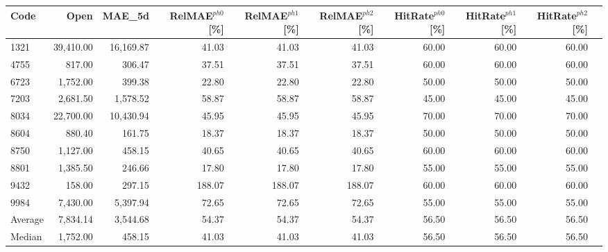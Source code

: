 \begingroup
\footnotesize
\begin{tabular}{lrrrrrrrrr}
\hline
Code & Open & MAE\_5d & RelMAE$^{ph0}$[\%] & RelMAE$^{ph1}$[\%] & RelMAE$^{ph2}$[\%] & HitRate$^{ph0}$[\%] & HitRate$^{ph1}$[\%] & HitRate$^{ph2}$[\%] \\
\hline
1321 & 39,410.00 & 16,169.87 & 41.03 & 41.03 & 41.03 & 60.00 & 60.00 & 60.00 \\
4755 & 817.00 & 306.47 & 37.51 & 37.51 & 37.51 & 60.00 & 60.00 & 60.00 \\
6723 & 1,752.00 & 399.38 & 22.80 & 22.80 & 22.80 & 50.00 & 50.00 & 50.00 \\
7203 & 2,681.50 & 1,578.52 & 58.87 & 58.87 & 58.87 & 45.00 & 45.00 & 45.00 \\
8034 & 22,700.00 & 10,430.94 & 45.95 & 45.95 & 45.95 & 70.00 & 70.00 & 70.00 \\
8604 & 880.40 & 161.75 & 18.37 & 18.37 & 18.37 & 50.00 & 50.00 & 50.00 \\
8750 & 1,127.00 & 458.15 & 40.65 & 40.65 & 40.65 & 60.00 & 60.00 & 60.00 \\
8801 & 1,385.50 & 246.66 & 17.80 & 17.80 & 17.80 & 55.00 & 55.00 & 55.00 \\
9432 & 158.00 & 297.15 & 188.07 & 188.07 & 188.07 & 60.00 & 60.00 & 60.00 \\
9984 & 7,430.00 & 5,397.94 & 72.65 & 72.65 & 72.65 & 55.00 & 55.00 & 55.00 \\
Average & 7,834.14 & 3,544.68 & 54.37 & 54.37 & 54.37 & 56.50 & 56.50 & 56.50 \\
Median & 1,752.00 & 458.15 & 41.03 & 41.03 & 41.03 & 56.50 & 56.50 & 56.50 \\
\hline
\end{tabular}
\endgroup